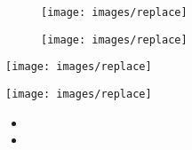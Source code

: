 \begin{figure}[!h]
    \centering
    \begin{minipage}[b]{.4\linewidth} %
        \texttt{[image: images/replace]}
        \label{fig:replace}
    \end{minipage}
    \hspace{.1\linewidth}%
    \begin{minipage}[b]{.4\linewidth} %
        \texttt{[image: images/replace]}
        \label{fig:replace}
    \end{minipage}
\end{figure}


\begin{center}
    \texttt{[image: images/replace]}
    \label{fig:replace}
\end{center}

\begin{center}
    \texttt{[image: images/replace]}
    \label{fig:replace}
\end{center}


\begin{itemize}
    \item
    \item
\end{itemize}


\begin{tableitemize}
    \item
    \item
\end{tableitemize}




